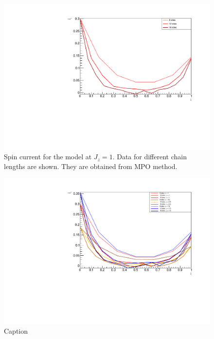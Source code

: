 \begin{figure}[H]
    \centering
    \includegraphics[scale=0.7]{Figures/NORM_SpinCurr_comparisonVSsize.pdf}
    \caption{Spin current for the model at $J_z = 1$. Data for different chain lengths are shown. They are obtained from MPO method.}
    \label{fig:my_label}
\end{figure}

\begin{figure}[H]
    \centering
    \includegraphics[scale=0.7]{Figures/SpinCurrcomparisonVSsizeANDdissipationRate.pdf}
    \caption{Caption}
    \label{fig:my_label}
\end{figure}